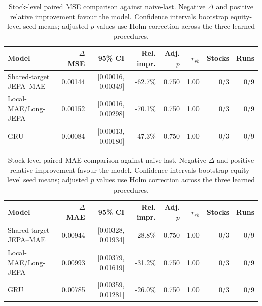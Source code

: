 \begin{table}[t]
\centering
\small
\caption{Stock-level paired MSE comparison against naive-last. Negative $\Delta$ and positive relative improvement favour the model. Confidence intervals bootstrap equity-level seed means; adjusted $p$ values use Holm correction across the three learned procedures.}
\label{tab:paired_mse_naive}
\begin{tabular}{lrrrrrrr}
\toprule
Model & $\Delta$MSE & 95\% CI & Rel. impr. & Adj. $p$ & $r_{rb}$ & Stocks & Runs \\
\midrule
Shared-target JEPA--MAE & 0.00144 & [0.00016, 0.00349] & -62.7\% & 0.750 & 1.00 & 0/3 & 0/9 \\
Local-MAE/Long-JEPA & 0.00152 & [0.00016, 0.00298] & -70.1\% & 0.750 & 1.00 & 0/3 & 0/9 \\
GRU & 0.00084 & [0.00013, 0.00180] & -47.3\% & 0.750 & 1.00 & 0/3 & 0/9 \\
\bottomrule
\end{tabular}
\end{table}

\begin{table}[t]
\centering
\small
\caption{Stock-level paired MAE comparison against naive-last. Negative $\Delta$ and positive relative improvement favour the model. Confidence intervals bootstrap equity-level seed means; adjusted $p$ values use Holm correction across the three learned procedures.}
\label{tab:paired_mae_naive}
\begin{tabular}{lrrrrrrr}
\toprule
Model & $\Delta$MAE & 95\% CI & Rel. impr. & Adj. $p$ & $r_{rb}$ & Stocks & Runs \\
\midrule
Shared-target JEPA--MAE & 0.00944 & [0.00328, 0.01934] & -28.8\% & 0.750 & 1.00 & 0/3 & 0/9 \\
Local-MAE/Long-JEPA & 0.00993 & [0.00379, 0.01619] & -31.2\% & 0.750 & 1.00 & 0/3 & 0/9 \\
GRU & 0.00785 & [0.00359, 0.01281] & -26.0\% & 0.750 & 1.00 & 0/3 & 0/9 \\
\bottomrule
\end{tabular}
\end{table}
